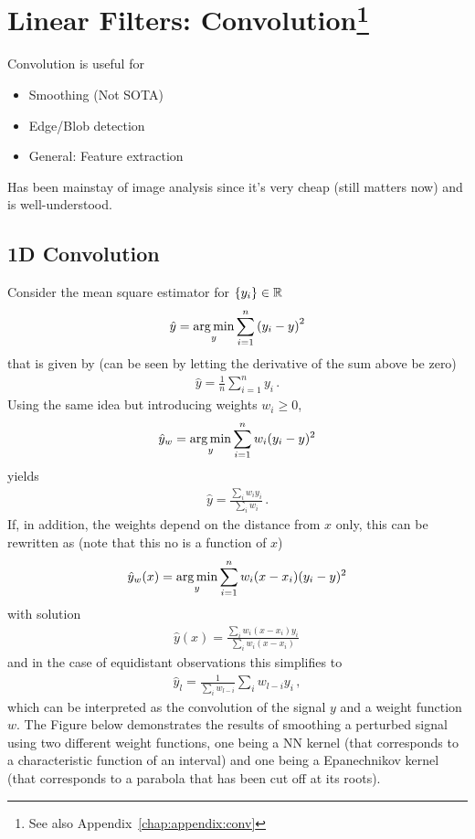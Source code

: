 \section[Convolution]{Linear Filters: Convolution\footnote{See also
    Appendix~\ref{chap:appendix:conv}}}
Convolution is useful for
\begin{itemize}
\item Smoothing (Not SOTA)
\item Edge/Blob detection
\item General: Feature extraction
\end{itemize}
Has been mainstay of image analysis since it's very cheap (still
matters now) and is well-understood.

\subsection*{1D Convolution}
Consider the mean square estimator for $\{y_i\} \in \mathbb{R}$
\begin{gather*}
  \hat{y} = \operatorname*{arg\,min}_y \sum_{i=1}^{n}{(y_i - y)}^2
\end{gather*}
that is given by (can be seen by letting the derivative of the sum
above be zero)
\begin{gather*}
  \hat{y} = \frac{1}{n} \sum_{i=1}^n y_i \,.
\end{gather*}
Using the same idea but introducing weights $w_i \ge 0$, \ie
\begin{gather*}
  \hat{y}_w = \operatorname*{arg\,min}_y \sum_{i=1}^n w_i (y_i - y)^2
\end{gather*}
yields
\begin{gather*}
  \hat{y} = \frac{\sum_i w_i y_i}{\sum_i w_i}\,.
\end{gather*}
If, in addition, the weights depend on the distance from $x$ only,
this can be rewritten as (note that this no is a function of $x$)
\begin{gather*}
  \hat{y}_w(x) = \operatorname*{arg\,min}_y \sum_{i=1}^n w_i(x - x_i) (y_i - y)^2
\end{gather*}
with solution
\begin{gather*}
  \hat{y}(x) = \frac{\sum_i w_i(x- x_i) y_i}{\sum_i w_i(x - x_i)}\,
\end{gather*}
and in the case of equidistant observations this simplifies to
\begin{gather*}
  \hat{y}_l = \frac{1}{\sum_i w_{l-i}}\sum_i w_{l-i} y_i\,,
\end{gather*}
which can be interpreted as the convolution of the signal $y$ and a
weight function $w$. The Figure below demonstrates the results of
smoothing a perturbed signal using two different weight functions, one
being a NN kernel (that corresponds to a characteristic function of an
interval) and one being a Epanechnikov kernel (that corresponds to a
parabola that has been cut off at its roots).

